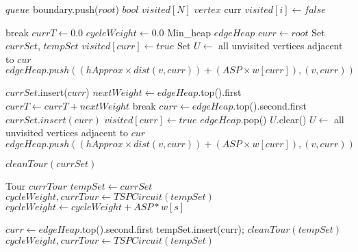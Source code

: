 \begin{algorithm}
\begin{algorithmic}

\State $queue$ boundary.push($root$) 
\State $bool$ $visited[N]$
\State $vertex$ curr 
	\State $visited[i] \gets false$ 
\EndFor

		\State break
	\EndIf
	\State $currT \gets 0.0$ 
	\State $cycleWeight \gets 0.0$ 
	\State Min\_heap $edgeHeap$  
	\State $curr \gets root$ 
	\State Set $currSet$, $tempSet$ 
	\State $visited[curr] \gets true$ 
	\State Set $U \gets$ all unvisited vertices adjacent to $cur$ 
		\State $edgeHeap.push((hApprox \times dist(v,curr)) + (ASP\times w[curr]) , (v,curr))$ 
	\EndFor

	\State $currSet$.insert($curr$) 
		\State $nextWeight \gets edgeHeap$.top().first 
		\State $currT \gets currT + nextWeight$ 
			break 
		\EndIf
		\State $curr \gets edgeHeap$.top().second.first 
		\State $currSet.insert(curr)$ 
		\State $visited[curr] \gets true$ 
		\State $edgeHeap$.pop() 
		\State $U$.clear() 
		\State $U \gets$ all unvisited vertices adjacent to $cur$ 
			\State $edgeHeap.push((hApprox \times dist(v,curr)) + (ASP\times w[curr]) , (v,curr))$ 
		\EndFor
	\EndWhile

	\State $cleanTour(currSet)$
	
	\State Tour $currTour$ 
	\State $tempSet \gets currSet$ 
	\State $cycleWeight , currTour \gets TSPCircuit(tempSet)$
		$cycleWeight \gets cycleWeight + ASP*w[s]$
	\EndFor
	
		\State $curr \gets edgeHeap$.top().second.first 
		\State tempSet.insert(curr);
		\State $cleanTour(tempSet)$
		\State $cycleWeight, currTour \gets TSPCircuit(tempSet)$ 

\end{algorithmic}
\end{algorithm}

